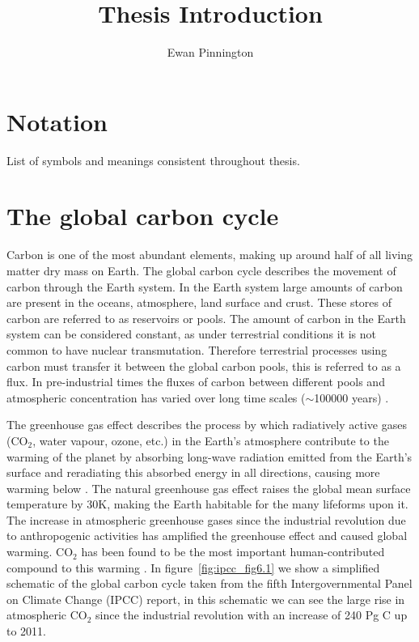 \documentclass[11pt]{article}
\title{Thesis Introduction}
\author{Ewan Pinnington}
\begin{document}
\maketitle

\section{Notation}
List of symbols and meanings consistent throughout thesis.

\section{The global carbon cycle}

Carbon is one of the most abundant elements, making up around half of all living matter dry mass on Earth. The global carbon cycle describes the movement of carbon through the Earth system. In the Earth system large amounts of carbon are present in the oceans, atmosphere, land surface and crust. These stores of carbon are referred to as reservoirs or pools. The amount of carbon in the Earth system can be considered constant, as under terrestrial conditions it is not common to have nuclear transmutation. Therefore terrestrial processes using carbon must transfer it between the global carbon pools, this is referred to as a flux. In pre-industrial times the fluxes of carbon between different pools and atmospheric concentration has varied over long time scales (\(\sim\)100000 years) \citep{luthi2008high}.

The greenhouse gas effect describes the process by which radiatively active gases (CO\(_{2}\), water vapour, ozone, etc.) in the Earth's atmosphere contribute to the warming of the planet by absorbing long-wave radiation emitted from the Earth's surface and reradiating this absorbed energy in all directions, causing more warming below \citep{mitchell1989greenhouse}. The natural greenhouse gas effect raises the global mean surface temperature by 30K, making the Earth habitable for the many lifeforms upon it. The increase in atmospheric greenhouse gases since the industrial revolution due to anthropogenic activities has amplified the greenhouse effect and caused global warming. CO\(_{2}\) has been found to be the most important human-contributed compound to this warming \citep{Falkowski291}. In figure~\ref{fig:ipcc_fig6.1} we show a simplified schematic of the global carbon cycle taken from the fifth Intergovernmental Panel on Climate Change (IPCC) report, in this schematic we can see the large rise in atmospheric CO\(_{2}\) since the industrial revolution with an increase of 240 Pg C up to 2011.
\end{document}
